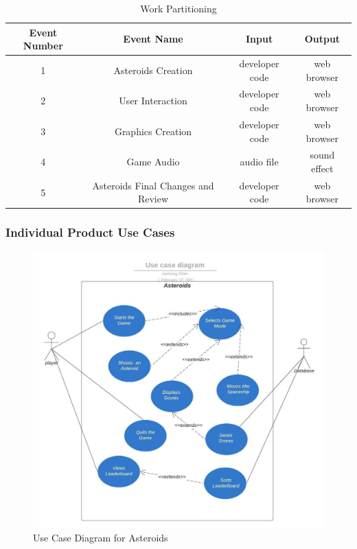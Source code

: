 \documentclass[12pt, titlepage]{article}
\begin{document}
\begin{table}[H]

		\centering
		\begin{tabular}{|c|c|c|c|}
			\hline
			Event Number& Event Name & Input & Output  \\ 
			\hline 
						1    &Asteroids Creation       &developer code     &web browser
          \\ 
			\hline 
						2  &User Interaction        &developer code      &web browser
        \\ 
			\hline 
						3  &Graphics Creation      &developer code     &web browser
       \\ 
			\hline 
						4  &Game Audio        &audio file      &sound effect
      \\
			\hline 
						5  &Asteroids Final Changes and Review        &developer code    &web browser
     \\ 
			\hline 
		\end{tabular} 
		\caption{Work Partitioning}
        \label{table:nonlin}
	\end{table}	

\newpage
\subsubsection{Individual Product Use Cases}
\begin{figure}[h]
	\centering
	\includegraphics[width=1\textwidth]{use case diagram.jpg}
	\caption{Use Case Diagram for Asteroids}
	\label{cat 1}
\end{figure}
\end{document}
